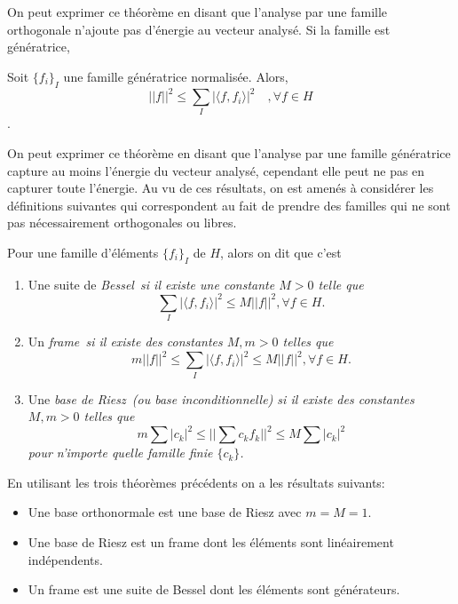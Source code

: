 On peut exprimer ce théorème en disant que l'analyse par une famille orthogonale n'ajoute pas d'énergie au vecteur analysé.
Si la famille est génératrice,
\begin{theoreme}\label{th:norm1}
	Soit $\{f_i\}_I$ une famille génératrice normalisée.
	Alors,
	\begin{equation*}
		||f||^2 \leq \sum_I |\langle f, f_i \rangle|^2 \quad, \forall f \in H
	\end{equation*}.
\end{theoreme}
On peut exprimer ce théorème en disant que l'analyse par une famille génératrice capture au moins l'énergie du vecteur analysé, cependant elle peut ne pas en capturer toute l'énergie.
Au vu de ces résultats, on est amenés à considérer les définitions suivantes qui correspondent au fait de prendre des familles qui ne sont pas nécessairement orthogonales ou libres.
\begin{definition}
	Pour une famille d'éléments $\{f_i\}_I$ de $H$, alors on dit que c'est 
	\begin{enumerate}
		\item Une suite de \it{Bessel} si il existe une constante $M>0$ telle que
			\begin{equation*}
				\sum_I |\langle f, f_i \rangle|^2 \leq M||f||^2, \forall f \in H.
			\end{equation*}
		\item Un \it{frame} si il existe des constantes $M, m>0$ telles que
			\begin{equation}\label{eq:defFrame}
				m||f||^2 \leq \sum_I |\langle f, f_i\rangle|^2 \leq M||f||^2, \forall f \in H.
			\end{equation}
		\item Une \it{base de Riesz} (ou base \it{inconditionnelle}) si il existe des constantes $M, m>0$ telles que
			\begin{equation*}
				m\sum |c_k|^2 \leq ||\sum c_k f_k||^2 \leq M\sum |c_k|^2
			\end{equation*}
		pour n'importe quelle famille finie $\{c_k\}$.
	\end{enumerate}
\end{definition}
En utilisant les trois théorèmes précédents on a les résultats suivants: 
\begin{proposition}
	\begin{itemize}
		\item Une base orthonormale est une base de Riesz avec $m = M = 1$.
		\item Une base de Riesz est un frame dont les éléments sont linéairement indépendents.
		\item Un frame est une suite de Bessel dont les éléments sont générateurs.
	\end{itemize}
\end{proposition}

